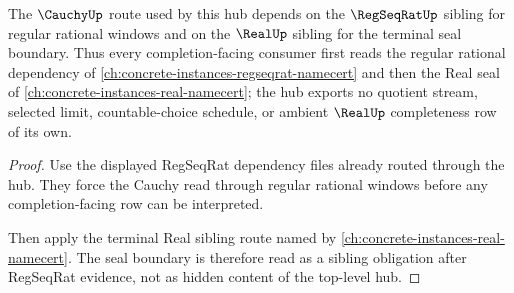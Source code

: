 \begin{theorem}
\label{thm:cauchy-regseqrat-real-sibling-lattice-repair}
The $\CauchyUp$ route used by this hub depends on the $\RegSeqRatUp$ sibling for regular rational windows and on the $\RealUp$ sibling for the terminal seal boundary. Thus every completion-facing consumer first reads the regular rational dependency of \autoref{ch:concrete-instances-regseqrat-namecert} and then the Real seal of \autoref{ch:concrete-instances-real-namecert}; the hub exports no quotient stream, selected limit, countable-choice schedule, or ambient $\RealUp$ completeness row of its own.
\end{theorem}
\begin{proof}
Use the displayed RegSeqRat dependency files already routed through the hub. They force the Cauchy read through regular rational windows before any completion-facing row can be interpreted.

Then apply the terminal Real sibling route named by \autoref{ch:concrete-instances-real-namecert}. The seal boundary is therefore read as a sibling obligation after RegSeqRat evidence, not as hidden content of the top-level hub.
\end{proof}
